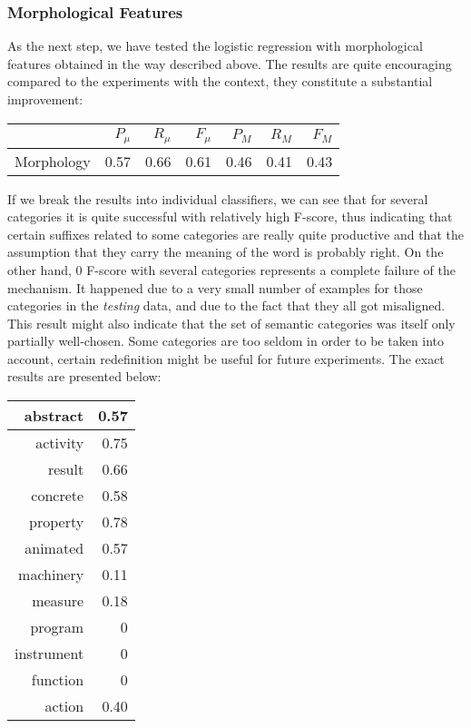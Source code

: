 \documentclass[letterpaper]{article}
\begin{document}
\subsubsection{Morphological Features}
As the next step, we have tested the logistic regression with morphological features obtained in the way described above. The results are quite encouraging compared to the experiments with the context, they constitute a substantial improvement:

\begin{table}[h]
\begin{tabular}{|r|r|r|r|r|r|r|}
 \hline
 & $P_\mu$ & $R_\mu$ & $F_\mu$ & $P_M$ & $R_M$  & $F_M$ \\ \hline
Morphology & 0.57 & 0.66 & 0.61 & 0.46 & 0.41 & 0.43 \\ \hline
\end{tabular}

\end{table}

If we break the results into individual classifiers, we can see that for several categories it is quite successful with relatively high F-score, thus indicating that certain suffixes related to some categories are really quite productive and that the assumption that they carry the meaning of the word is probably right. On the other hand, 0 F-score with several categories represents a complete failure of the mechanism. It happened due to a very small number of examples for those categories in the \emph{testing} data, and due to the fact that they all got misaligned. This result might also indicate that the set of semantic categories was itself only partially well-chosen. Some categories are too seldom in order to be taken into account, certain redefinition might be useful for future experiments. The exact results are presented below: 


\begin{tabular}{|r|r|}
\hline
abstract & 0.57 \\ \hline
activity & 0.75 \\ \hline
result & 0.66 \\ \hline
concrete & 0.58 \\ \hline
property & 0.78 \\ \hline
animated & 0.57 \\ \hline
machinery & 0.11 \\ \hline
measure & 0.18 \\ \hline
program & 0 \\ \hline
instrument & 0 \\ \hline
function & 0 \\ \hline
action & 0.40 \\ \hline 

\end{tabular}
\end{document}

